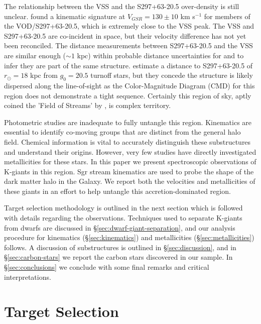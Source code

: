 \documentclass[preprint2]{aastex}
\begin{document}
The relationship between the VSS and the S297+63-20.5 over-density is still unclear. \citet{Newberg;et-al_2007} found a kinematic signature at $V_{GSR} = 130 \pm 10$ km s$^{-1}$ for members of the VOD/S297+63-20.5, which is extremely close to the VSS peak. The VSS and S297+63-20.5 are co-incident in space, but their velocity difference has not yet been reconciled. The distance measurements between S297+63-20.5 and the VSS are similar enough ($\sim1$ kpc) within probable distance uncertainties for \citet{Newberg;et-al_2007} and \citet{Prior;et-al_2009a} to infer they are part of the same structure. \citet{Newberg;et-al_2007} estimate a distance to S297+63-20.5 of $r_\odot = 18$ kpc from $g_0 = 20.5$ turnoff stars, but they concede the structure is likely dispersed along the line-of-sight as the Color-Magnitude Diagram (CMD) for this region does not demonstrate a tight sequence.  Certainly this region of sky, aptly coined the 'Field of Streams' by \citet{Belokurov;et-al_2006}, is complex territory.
	
Photometric studies are inadequate to fully untangle this region. Kinematics are essential to identify co-moving groups that are distinct from the general halo field. Chemical information is vital to accurately distinguish these substructures and understand their origins. However, very few studies have directly investigated metallicities for these stars. In this paper we present spectroscopic observations of K-giants in this region.  Sgr stream kinematics are used to probe the shape of the dark matter halo in the Galaxy. We report both the velocities and metallicities of these giants in an effort to help untangle this accretion-dominated region.

Target selection methodology is outlined in the next section which is followed with details regarding the observations. Techniques used to separate K-giants from dwarfs are discussed in \S\ref{sec:dwarf-giant-separation}, and our analysis procedure for kinematics (\S\ref{sec:kinematics}) and metallicities (\S\ref{sec:metallicities}) follows. A discussion of substructures is outlined in \S\ref{sec:discussion}, and in \S\ref{sec:carbon-stars} we report the carbon stars discovered in our sample. In \S\ref{sec:conclusions} we conclude with some final remarks and critical interpretations. 
		
\section{Target Selection}
\label{sec:target-selection}
	
\end{document}
